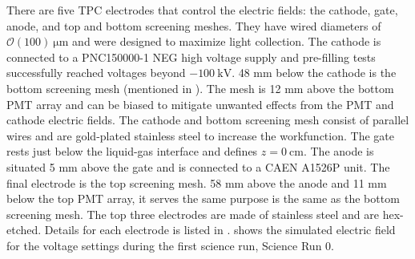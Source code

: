 There are five TPC electrodes that control the electric fields: the cathode, gate, anode, and top and bottom screening meshes.  They have
wired diameters of $\mathcal{O}(100)\ \mathrm{\mu m}$ and were designed to maximize light collection.  The cathode is connected to a
PNC150000-1 NEG high voltage supply and pre-filling tests successfully reached voltages beyond $-100\ \mathrm{kV}$.  48
mm below the cathode is the bottom screening mesh (mentioned in ).  The mesh is 12 mm above the bottom PMT
array and can be biased to mitigate unwanted effects from the PMT and cathode electric fields.  The cathode and bottom screening mesh
consist of
parallel wires and are gold-plated stainless steel to increase the workfunction.  The gate rests just below the
liquid-gas interface and defines $z = 0\ \mathrm{cm}$.  The anode is
situated 5 mm above the gate and is connected to a CAEN A1526P unit.  The final electrode is the top screening mesh.  58 mm above
the anode and 11 mm below the top PMT array, it serves the same purpose is the same as the bottom screening mesh.  The top three
electrodes are made of stainless steel and are hex-etched.  Details for each electrode is listed in
.   shows the simulated electric field for the voltage settings during
the first science run, Science Run 0.

\bgroup
\def\arraystretch{1.2}
\begin{table}
\centering
{}
\caption{Properties for TPC electrodes.  The cathode and bottom screening mesh have high transparency to optimize S1 light collection and
are gold-plated to decrease the risk of photoionization.}
\label{tab:xenon1t_tpc_electrodes}
\end{table}

